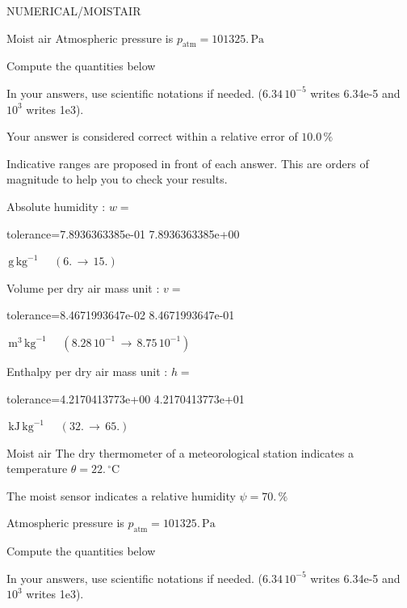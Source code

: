 \documentclass[12pt]{article}
\begin{document}
\begin{quiz}{NUMERICAL/MOISTAIR}
\begin{cloze}{Moist air}
Atmospheric pressure is $p_{\text{atm}} = 101325.\,  \mathrm{Pa} $

 

Compute the quantities below

In your answers, use scientific notations if needed.  ($6.34\, 10^{-5}$ writes 6.34e-5 and $10^{3}$ writes 1e3).

Your answer is considered correct within a relative error of $10.0\, \% $

Indicative ranges are proposed in front of each answer. This are orders of magnitude to help you to check your results.

Absolute humidity : $w =  $
\begin{numerical}[points=1] 
\item[tolerance={7.8936363385e-01}] 7.8936363385e+00 
\end{numerical} 
 $\,  \mathrm{g}\,  \mathrm{kg}^{-1}$ 
 $ \quad (6. \, \rightarrow \, 15.) $ 

Volume per dry air mass unit : $v =  $
\begin{numerical}[points=1] 
\item[tolerance={8.4671993647e-02}] 8.4671993647e-01 
\end{numerical} 
 $\,  \mathrm{m}^{3}\,  \mathrm{kg}^{-1}$ 
 $ \quad ( 8.28 \, 10^{-1}  \, \rightarrow \,  8.75 \, 10^{-1} ) $ 

Enthalpy per dry air mass unit : $h =  $
\begin{numerical}[points=2] 
\item[tolerance={4.2170413773e+00}] 4.2170413773e+01 
\end{numerical} 
 $\,  \mathrm{kJ}\,  \mathrm{kg}^{-1}$ 
 $ \quad (32. \, \rightarrow \, 65.) $ 

\end{cloze} 


 \begin{cloze}{Moist air} 
The dry thermometer of a meteorological station indicates a temperature $\theta = 22.\,  \mathrm{^\circ\mathrm{C}} $

The moist sensor indicates a relative humidity $\psi = 70.\, \% $

Atmospheric pressure is $p_{\text{atm}} = 101325.\,  \mathrm{Pa} $

 

Compute the quantities below

In your answers, use scientific notations if needed.  ($6.34\, 10^{-5}$ writes 6.34e-5 and $10^{3}$ writes 1e3).


\end{cloze}
\end{quiz}
\end{document}
